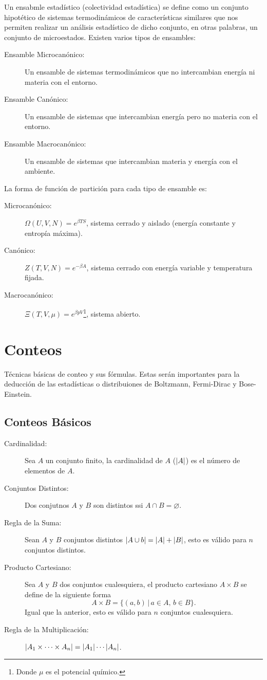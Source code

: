 Un ensabmle estadístico (colectividad estadística) se define como un conjunto hipotético de sistemas termodinámicos de características similares que nos permiten realizar un análisis estadístico de dicho conjunto, en otras palabras, un conjunto de microestados. Existen varios tipos de ensambles:
\begin{description}
    \item[Ensamble Microcanónico: ] Un ensamble de sistemas termodinámicos que no intercambian energía ni materia con el entorno.
    \item[Ensamble Canónico: ] Un ensamble de sistemas que intercambian energía pero no materia con el entorno.
    \item[Ensamble Macrocanónico: ] Un ensamble de sistemas que intercambian materia y energía con el ambiente.
\end{description}

La forma de función de partición para cada tipo de ensamble es:
\begin{description}
    \item[Microcanónico: ] $\Omega (U,V,N) = e^{\beta TS}$, sistema cerrado y aislado (energía constante y entropía máxima).
    \item[Canónico: ] $Z(T,V,N) = e^{-\beta A}$, sistema cerrado con energía variable y temperatura fijada.
    \item[Macrocanónico: ] $\Xi (T,V,\mu) = e^{\beta pV}$\footnote{Donde $\mu$ es el potencial químico.}, sistema abierto.
\end{description}


\section{Conteos}
Técnicas básicas de conteo y sus fórmulas. Estas serán importantes para la deducción de las estadísticas o distribuiones de Boltzmann, Fermi-Dirac y Bose-Einstein.
\subsection{Conteos Básicos}

\begin{description}
    \item[Cardinalidad: ] Sea $A$ un conjunto finito, la cardinalidad de $A$ ($\abs{A}$) es el número de elementos de $A$. 
    \item[Conjuntos Distintos: ] Dos conjutnos $A$ y $B$ son distintos ssi $A\cap B = \varnothing$.
    \item[Regla de la Suma: ] Sean $A$ y $B$ conjuntos distintos $\abs{A\cup b} = \abs{A} + \abs{B}$, esto es válido para $n$ conjuntos distintos.
    \item[Producto Cartesiano: ] Sea $A$ y $B$ dos conjuntos cualesquiera, el producto cartesiano $A \times  B$ se define de la siguiente forma
        $$ A \times B = \{ (a,b) \, | \, a\in A,\, b\in B \} . $$
        Igual que la anterior, esto es válido para $n$ conjuntos cualesquiera.
    \item[Regla de la Multiplicación: ] $\abs{A_1 \times \cdots \times A_n} = \abs{A_1} \cdots \abs{A_n}$.
\end{description}

